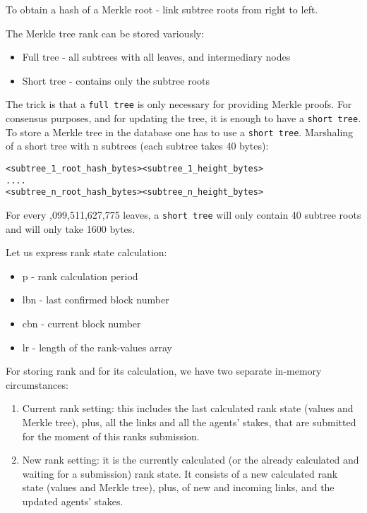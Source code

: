 \documentclass[8pt,oneside]{amsart}
\newcommand{\code}[1]{{\PlayBold #1}}
\begin{document}
\begin{Abstract}
To obtain a hash of a Merkle root - link subtree roots from right to left.

The Merkle tree rank can be stored variously:

\begin{itemize}
\item[] Full tree - all subtrees with all leaves, and intermediary nodes
\item[] Short tree - contains only the subtree roots
\end{itemize}

The trick is that a \verb|full tree| is only necessary for providing Merkle proofs. For consensus purposes, and for updating the tree, it is enough to have a \verb|short tree|. To store a Merkle tree in the database one has to use a \verb|short tree|. Marshaling of a short tree with \code{n} subtrees (each subtree takes 40 bytes):

\begin{lstlisting}
<subtree_1_root_hash_bytes><subtree_1_height_bytes>
....
<subtree_n_root_hash_bytes><subtree_n_height_bytes>
\end{lstlisting}

For every \code{1,099,511,627,775} leaves, a \verb|short tree| will only contain 40 subtree roots and will only take 1600 bytes.

Let us express rank state calculation:

\begin{itemize}
    \item[] \code{p} - rank calculation period
    \item[] \code{lbn} - last confirmed block number
    \item[] \code{cbn} - current block number
    \item[] \code{lr} -  length of the rank-values array
\end{itemize}

For storing rank and for its calculation, we have two separate in-memory circumstances:

\begin{enumerate}
\item Current rank setting: this includes the last calculated rank state (values and Merkle tree), plus,
all the links and all the agents' stakes, that are submitted for the moment of this ranks submission.
\item New rank setting: it is the currently calculated (or the already calculated and waiting for a submission) rank state. It consists of a new calculated rank state (values and Merkle tree), plus, of new and incoming links, and the updated agents' stakes.
\end{enumerate}


\end{Abstract}
\end{document}
